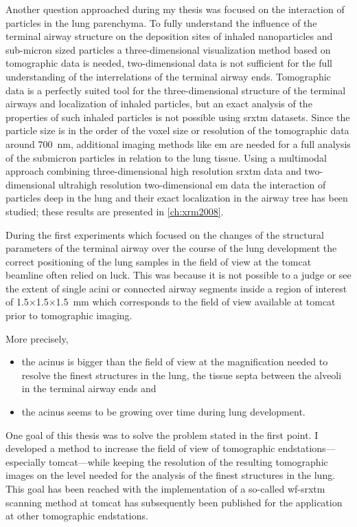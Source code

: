 Another question approached during my thesis was focused on the interaction of particles in the lung parenchyma. To fully understand the influence of the terminal airway structure on the deposition sites of inhaled nanoparticles and sub-micron sized particles a three-dimensional visualization method based on tomographic data is needed, two-dimensional data is not sufficient for the full understanding of the interrelations of the terminal airway ends. Tomographic data is a perfectly suited tool for the three-dimensional structure of the terminal airways and localization of inhaled particles, but an exact analysis of the properties of such inhaled particles is not possible using \ac{srxtm} datasets. Since the particle size is in the order of the voxel size or resolution of the tomographic data around \SI{700}{nm}, additional imaging methods like \ac{em} are needed for a full analysis of the submicron particles in relation to the lung tissue. Using a multimodal approach combining three-dimensional high resolution \ac{srxtm} data and two-dimensional ultrahigh resolution two-dimensional \ac{em} data the interaction of particles deep in the lung and their exact localization in the airway tree has been studied; these results are presented in \autoref{ch:xrm2008}.

During the first experiments which focused on the changes of the structural parameters of the terminal airway over the course of the lung development the correct positioning of the lung samples in the field of view at the \ac{tomcat} beamline often relied on luck. This was because it is not possible to a judge or see the extent of single acini or connected airway segments inside a region of interest of 1.5$\times$1.5$\times$\SI{1.5}{\milli\meter} which corresponds to the field of view available at \ac{tomcat} prior to tomographic imaging.

More precisely, 
\begin{itemize}
	\item the acinus is bigger than the field of view at the magnification needed to resolve the finest structures in the lung, the tissue septa between the alveoli in the terminal airway ends and
	\item the acinus seems to be growing over time during lung development.
\end{itemize}

One goal of this thesis was to solve the problem stated in the first point. I developed a method to increase the field of view of tomographic endstations---especially \ac{tomcat}---while keeping the resolution of the resulting tomographic images on the level needed for the analysis of the finest structures in the lung. This goal has been reached with the implementation of a so-called \ac{wf-srxtm} scanning method at \ac{tomcat} has subsequently been published for the application at other tomographic endstations.

